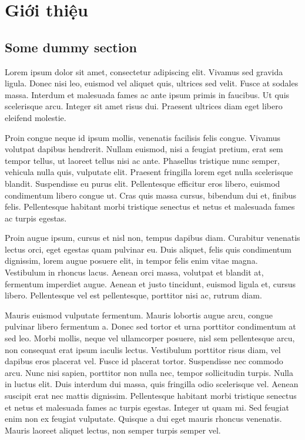 \chapter{Giới thiệu}
\label{introduction}

\section{Some dummy section}


Lorem ipsum dolor sit amet, consectetur adipiscing elit. Vivamus sed gravida ligula. Donec nisi leo, euismod vel aliquet quis, ultrices sed velit. Fusce at sodales massa. Interdum et malesuada fames ac ante ipsum primis in faucibus. Ut quis scelerisque arcu. Integer sit amet risus dui. Praesent ultrices diam eget libero eleifend molestie.

Proin congue neque id ipsum mollis, venenatis facilisis felis congue. Vivamus volutpat dapibus hendrerit. Nullam euismod, nisi a feugiat pretium, erat sem tempor tellus, ut laoreet tellus nisi ac ante. Phasellus tristique nunc semper, vehicula nulla quis, vulputate elit. Praesent fringilla lorem eget nulla scelerisque blandit. Suspendisse eu purus elit. Pellentesque efficitur eros libero, euismod condimentum libero congue ut. Cras quis massa cursus, bibendum dui et, finibus felis. Pellentesque habitant morbi tristique senectus et netus et malesuada fames ac turpis egestas.

Proin augue ipsum, cursus et nisl non, tempus dapibus diam. Curabitur venenatis lectus orci, eget egestas quam pulvinar eu. Duis aliquet, felis quis condimentum dignissim, lorem augue posuere elit, in tempor felis enim vitae magna. Vestibulum in rhoncus lacus. Aenean orci massa, volutpat et blandit at, fermentum imperdiet augue. Aenean et justo tincidunt, euismod ligula et, cursus libero. Pellentesque vel est pellentesque, porttitor nisi ac, rutrum diam.

Mauris euismod vulputate fermentum. Mauris lobortis augue arcu, congue pulvinar libero fermentum a. Donec sed tortor et urna porttitor condimentum at sed leo. Morbi mollis, neque vel ullamcorper posuere, nisl sem pellentesque arcu, non consequat erat ipsum iaculis lectus. Vestibulum porttitor risus diam, vel dapibus eros placerat vel. Fusce id placerat tortor. Suspendisse nec commodo arcu. Nunc nisi sapien, porttitor non nulla nec, tempor sollicitudin turpis. Nulla in luctus elit. Duis interdum dui massa, quis fringilla odio scelerisque vel. Aenean suscipit erat nec mattis dignissim. Pellentesque habitant morbi tristique senectus et netus et malesuada fames ac turpis egestas. Integer ut quam mi. Sed feugiat enim non ex feugiat vulputate. Quisque a dui eget mauris rhoncus venenatis. Mauris laoreet aliquet lectus, non semper turpis semper vel.

